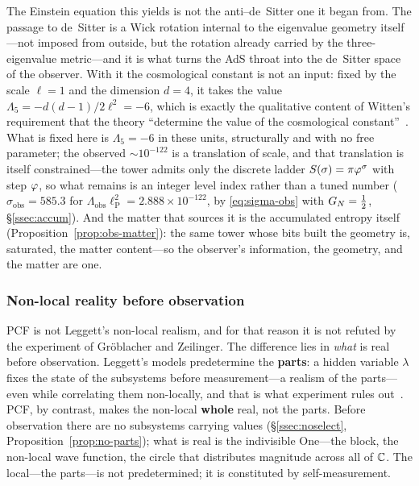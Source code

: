 The Einstein equation this yields is not the anti--de~Sitter one it began from. The passage to de~Sitter is a Wick rotation internal to the eigenvalue geometry itself---not imposed from outside, but the rotation already carried by the three-eigenvalue metric---and it is what turns the AdS throat into the de~Sitter space of the observer. With it the cosmological constant is not an input: fixed by the scale $\ell=1$ and the dimension $d=4$, it takes the value $\Lambda_5=-d(d-1)/2\ell^{2}=-6$, which is exactly the qualitative content of Witten's requirement that the theory ``determine the value of the cosmological constant''~\cite{Witten01dS}. What is fixed here is $\Lambda_5=-6$ in these units, structurally and with no free parameter; the observed ${\sim}10^{-122}$ is a translation of scale, and that translation is itself constrained---the tower admits only the discrete ladder $S(\sigma)=\pi\varphi^{\sigma}$ with step $\varphi$, so what remains is an integer level index rather than a tuned number ($\sigma_{\mathrm{obs}}=585.3$ for $\Lambda_{\mathrm{obs}}\ell_{\mathrm{P}}^{2}=2.888\times10^{-122}$, by \eqref{eq:sigma-obs} with $G_{N}=\tfrac12$, \S\ref{ssec:accum}). And the matter that sources it is the accumulated entropy itself (Proposition~\ref{prop:obs-matter}): the same tower whose bits built the geometry is, saturated, the matter content---so the observer's information, the geometry, and the matter are one.

\subsubsection{Non-local reality before observation}\label{sssec:disc-nonlocal}

PCF is not Leggett's non-local realism, and for that reason it is not refuted by the experiment of Gr\"oblacher and Zeilinger. The difference lies in \emph{what} is real before observation. Leggett's models predetermine the \textbf{parts}: a hidden variable $\lambda$ fixes the state of the subsystems before measurement---a realism of the parts---even while correlating them non-locally, and that is what experiment rules out~\cite{Leggett03,Groblacher07}. PCF, by contrast, makes the non-local \textbf{whole} real, not the parts. Before observation there are no subsystems carrying values (\S\ref{ssec:noselect}, Proposition~\ref{prop:no-parts}); what is real is the indivisible One---the block, the non-local wave function, the circle that distributes magnitude across all of $\mathbb{C}$. The local---the parts---is not predetermined; it is constituted by self-measurement.

